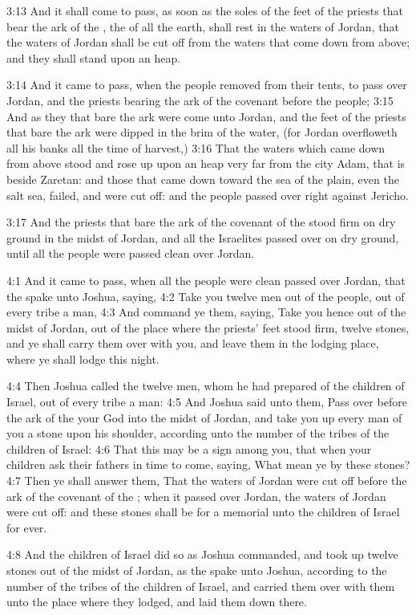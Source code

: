 3:13 And it shall come to pass, as soon as the soles of the feet of
the priests that bear the ark of the \LORD, the \LORD of all the earth,
shall rest in the waters of Jordan, that the waters of Jordan shall be
cut off from the waters that come down from above; and they shall
stand upon an heap.

3:14 And it came to pass, when the people removed from their tents, to
pass over Jordan, and the priests bearing the ark of the covenant
before the people; 3:15 And as they that bare the ark were come unto
Jordan, and the feet of the priests that bare the ark were dipped in
the brim of the water, (for Jordan overfloweth all his banks all the
time of harvest,) 3:16 That the waters which came down from above
stood and rose up upon an heap very far from the city Adam, that is
beside Zaretan: and those that came down toward the sea of the plain,
even the salt sea, failed, and were cut off: and the people passed
over right against Jericho.

3:17 And the priests that bare the ark of the covenant of the \LORD
stood firm on dry ground in the midst of Jordan, and all the
Israelites passed over on dry ground, until all the people were passed
clean over Jordan.

4:1 And it came to pass, when all the people were clean passed over
Jordan, that the \LORD spake unto Joshua, saying, 4:2 Take you twelve
men out of the people, out of every tribe a man, 4:3 And command ye
them, saying, Take you hence out of the midst of Jordan, out of the
place where the priests' feet stood firm, twelve stones, and ye shall
carry them over with you, and leave them in the lodging place, where
ye shall lodge this night.

4:4 Then Joshua called the twelve men, whom he had prepared of the
children of Israel, out of every tribe a man: 4:5 And Joshua said unto
them, Pass over before the ark of the \LORD your God into the midst of
Jordan, and take you up every man of you a stone upon his shoulder,
according unto the number of the tribes of the children of Israel: 4:6
That this may be a sign among you, that when your children ask their
fathers in time to come, saying, What mean ye by these stones?  4:7
Then ye shall answer them, That the waters of Jordan were cut off
before the ark of the covenant of the \LORD; when it passed over
Jordan, the waters of Jordan were cut off: and these stones shall be
for a memorial unto the children of Israel for ever.

4:8 And the children of Israel did so as Joshua commanded, and took up
twelve stones out of the midst of Jordan, as the \LORD spake unto
Joshua, according to the number of the tribes of the children of
Israel, and carried them over with them unto the place where they
lodged, and laid them down there.

